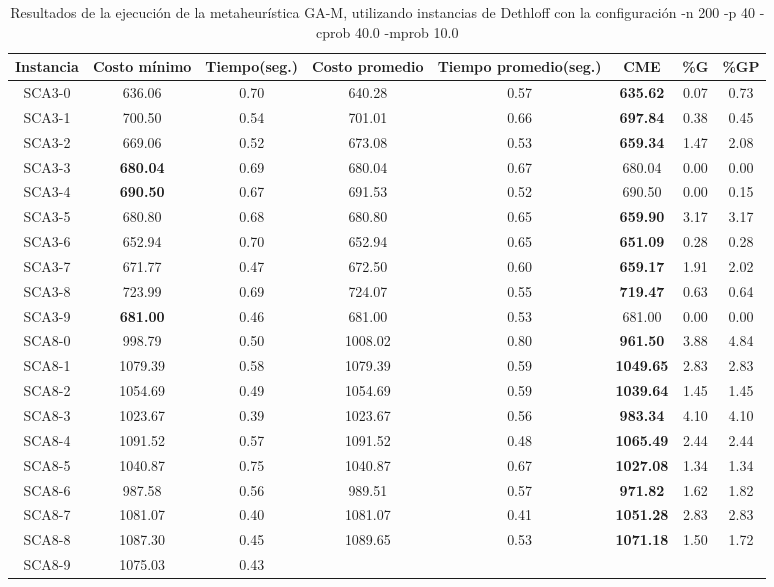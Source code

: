 \begin{table}[ht]
\caption{Resultados de la ejecución de la metaheurística GA-M, utilizando instancias de Dethloff con la configuración -n 200 -p 40 -cprob 40.0 -mprob 10.0}
\centering
\small
\begin{tabular}{c c c c c c c c}
\hline\hline
Instancia & Costo mínimo & Tiempo(seg.) & Costo promedio & Tiempo promedio(seg.) & CME & \%G & \%GP \\ [0.5ex]
\hline
SCA3-0 & 636.06 & 0.70 & 
640.28 & 0.57 & \bf{635.62} & 
0.07 & 0.73\\SCA3-1 & 700.50 & 0.54 & 
701.01 & 0.66 & \bf{697.84} & 
0.38 & 0.45\\SCA3-2 & 669.06 & 0.52 & 
673.08 & 0.53 & \bf{659.34} & 
1.47 & 2.08\\SCA3-3 & \bf{680.04} & 0.69 & 
680.04 & 0.67 & 680.04 & 0.00
 & 0.00\\
SCA3-4 & \bf{690.50} & 0.67 & 
691.53 & 0.52 & 690.50 & 0.00
 & 0.15\\SCA3-5 & 680.80 & 0.68 & 
680.80 & 0.65 & \bf{659.90} & 
3.17 & 3.17\\SCA3-6 & 652.94 & 0.70 & 
652.94 & 0.65 & \bf{651.09} & 
0.28 & 0.28\\SCA3-7 & 671.77 & 0.47 & 
672.50 & 0.60 & \bf{659.17} & 
1.91 & 2.02\\SCA3-8 & 723.99 & 0.69 & 
724.07 & 0.55 & \bf{719.47} & 
0.63 & 0.64\\SCA3-9 & \bf{681.00} & 0.46 & 
681.00 & 0.53 & 681.00 & 0.00
 & 0.00\\
SCA8-0 & 998.79 & 0.50 & 
1008.02 & 0.80 & \bf{961.50} & 
3.88 & 4.84\\SCA8-1 & 1079.39 & 0.58 & 
1079.39 & 0.59 & \bf{1049.65} & 
2.83 & 2.83\\SCA8-2 & 1054.69 & 0.49 & 
1054.69 & 0.59 & \bf{1039.64} & 
1.45 & 1.45\\SCA8-3 & 1023.67 & 0.39 & 
1023.67 & 0.56 & \bf{983.34} & 
4.10 & 4.10\\SCA8-4 & 1091.52 & 0.57 & 
1091.52 & 0.48 & \bf{1065.49} & 
2.44 & 2.44\\SCA8-5 & 1040.87 & 0.75 & 
1040.87 & 0.67 & \bf{1027.08} & 
1.34 & 1.34\\SCA8-6 & 987.58 & 0.56 & 
989.51 & 0.57 & \bf{971.82} & 
1.62 & 1.82\\SCA8-7 & 1081.07 & 0.40 & 
1081.07 & 0.41 & \bf{1051.28} & 
2.83 & 2.83\\SCA8-8 & 1087.30 & 0.45 & 
1089.65 & 0.53 & \bf{1071.18} & 
1.50 & 1.72\\SCA8-9 & 1075.03 & 0.43 & 

\end{tabular}
\end{table}
